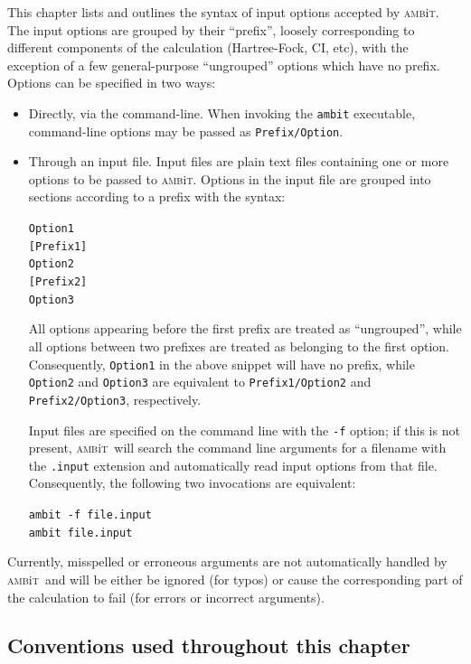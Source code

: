 \documentclass{report}
\newcommand{\ambit}{\textsc{amb}{\footnotesize i}\textsc{t}}
\begin{document}
This chapter lists and outlines the syntax of input options accepted by \ambit. The input options are
grouped by their ``prefix'', loosely corresponding to different components of the calculation
(Hartree-Fock, CI, etc), with the exception of a few general-purpose ``ungrouped'' options which have no
prefix. Options can be specified in two ways:
\begin{itemize}
\item Directly, via the command-line. When invoking the \texttt{ambit} executable, command-line options 
may be passed as \texttt{Prefix/Option}.
\item Through an input file. Input files are plain text files containing one or more options to be
passed to \ambit. Options in the input file are grouped into sections according to a prefix with the
syntax:

\texttt{Option1}\\
\texttt{[Prefix1]}\\
\texttt{Option2}\\
\texttt{[Prefix2]}\\
\texttt{Option3}

All options appearing before the first prefix are treated as ``ungrouped'', while all options between
two prefixes are treated as belonging to the first option. Consequently, \texttt{Option1} in the above
snippet will have no prefix, while \texttt{Option2} and \texttt{Option3} are equivalent to
\texttt{Prefix1/Option2} and \texttt{Prefix2/Option3}, respectively.

Input files are specified on the command line with the \texttt{-f} option; if this is not present,
\ambit\ will search the command line arguments for a filename with the \texttt{.input} extension and
automatically read input options from that file. Consequently, the following two invocations are
equivalent:

\texttt{ambit -f file.input}\\
\texttt{ambit file.input}
\end{itemize}

Currently, misspelled or erroneous arguments are not automatically handled by \ambit\ 
and will be either be ignored (for typos) or cause the corresponding part of the calculation to fail 
(for errors or incorrect arguments).

\subsection{Conventions used throughout this chapter}
\end{document}
